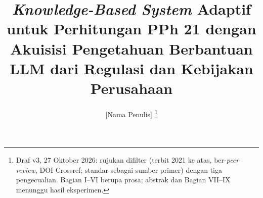 \documentclass[journal,a4paper]{IEEEtran}
\newcommand{\en}[1]{\textit{#1}}
\begin{document}
\title{\en{Knowledge-Based System} Adaptif untuk Perhitungan PPh 21 dengan Akuisisi Pengetahuan Berbantuan LLM dari Regulasi dan Kebijakan Perusahaan}
\author{[Nama Penulis]%
\thanks{Draf v3, 27 Oktober 2026: rujukan difilter (terbit 2021 ke atas, ber-\en{peer review}, DOI Crossref; standar sebagai sumber primer) dengan tiga pengecualian. Bagian I--VI berupa prosa; abstrak dan Bagian VII--IX menunggu hasil eksperimen.}}
\maketitle














\end{document}
